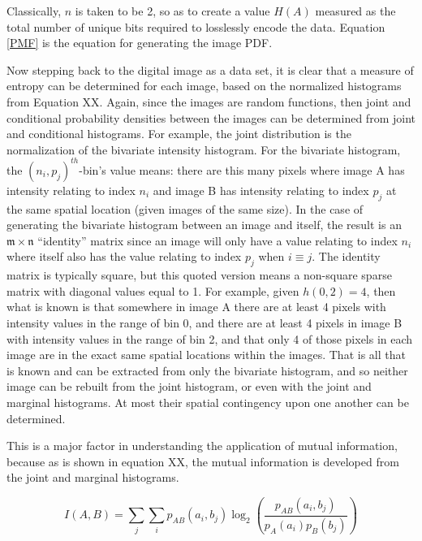 Classically, $n$ is taken to be 2, so as to create a value $H(A)$ measured as the total number of unique bits required to losslessly encode the data. Equation \ref{PMF} is the equation for generating the image PDF.

Now stepping back to the digital image as a data set, it is clear that a measure of entropy can be determined for each image, based on the normalized histograms from Equation XX. Again, since the images are random functions, then joint and conditional probability densities between the images can be determined from joint and conditional histograms. For example, the joint distribution is the normalization of the bivariate intensity histogram. For the bivariate histogram, the $(n_{i},p_{j})^{th}${-}bin's value means: there are this many pixels where image A has intensity relating to index $n_{i}$ and image B has intensity relating to index $p_{j}$ at the same spatial location (given images of the same size). In the case of generating the bivariate histogram between an image and itself, the result is an $\mathfrak{m} \times \mathfrak{n}$ ``identity'' matrix since an image will only have a value relating to index $n_{i}$ where itself also has the value relating to index $p_{j}$ when $i \equiv j$. The identity matrix is typically square, but this quoted version means a non-square sparse matrix with diagonal values equal to 1. For example, given $h(0,2)=4$, then what is known is that somewhere in image A there are at least 4 pixels with intensity values in the range of bin 0, and there are at least 4 pixels in image B with intensity values in the range of bin 2, and that only 4 of those pixels in each image are in the exact same spatial locations within the images. That is all that is known and can be extracted from only the bivariate histogram, and so neither image can be rebuilt from the joint histogram, or even with the joint and marginal histograms. At most their spatial contingency upon one another can be determined.

This is a major factor in understanding the application of mutual information, because as is shown in equation XX, the mutual information is developed from the joint and marginal histograms.

\begin{equation}
\label{MutualInformation}
	I(A,B) = \sum_{j}{\sum_{i}{p_{AB}(a_{i},b_{j}) \log_{2}{\left( \frac{p_{AB}(a_{i},b_{j})}{p_{A}(a_{i})p_{B}(b_{j})}\right)}}}
\end{equation}


